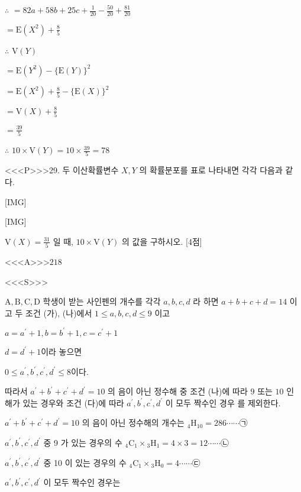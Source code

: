 \documentclass{oblivoir}
\begin{document}
$\therefore$ $=82 a+58 b+25 c+\frac{1}{20}-\frac{50}{20}+\frac{81}{20}$

$= \mathrm{E}\left(X^{2}\right)+\frac{8}{5}$

$\therefore$ $\mathrm{V}(Y)$

$=\mathrm{E}\left(Y^{2}\right)-\{\mathrm{E}(Y)\}^{2}$

$=\mathrm{E}\left(X^{2}\right)+\frac{8}{5}-\{\mathrm{E}(X)\}^{2}$

$=\mathrm{V}(X)+\frac{8}{5}$

$=\frac{39}{5}$

$\therefore$ $10 \times \mathrm{V}(Y)=10 \times \frac{39}{5}=78 $


<<<P>>>29. 두 이산확률변수 $X, Y$ 의 확률분포를 표로 나타내면 각각 다음과 같다.

[IMG]

[IMG]

$\mathrm{V}(X)=\frac{31}{5}$ 일 때, $10 \times \mathrm{V}(Y)$ 의 값을 구하시오. [4점]

<<<A>>>$218$

<<<S>>>



$\mathrm{A}, \mathrm{B}, \mathrm{C}, \mathrm{D}$ 학생이 받는 사인펜의 개수를 각각 $a, b, c, d$ 라 하면 $a+b+c+d=14$ 이고
두 조건 (가), (나)에서 $1 \leq a, b, c, d \leq 9$ 이고

$a=a^{\prime}+1, b=b^{\prime}+1, c=c^{\prime}+1$

$d=d^{\prime}+1$이라 놓으면

$0 \leq a^{\prime}, b^{\prime}, c^{\prime}, d^{\prime} \leq 8 $이다.

따라서 $a^{\prime}+b^{\prime}+c^{\prime}+d^{\prime}=10$ 의 음이 아닌 정수해 중 조건 (나)에 따라 $9$ 또는 $10$ 인 해가 있는 경우와 조건 (다)에 따라 $a^{\prime}, b^{\prime}, c^{\prime}, d^{\prime}$ 이 모두 짝수인 경우 를 제외한다.

$a^{\prime}+b^{\prime}+c^{\prime}+d^{\prime}=10$ 의 음이 아닌 정수해의 개수는
${ }_{4} \mathrm{H}_{10}=286 \cdots \cdots $㉠

$a^{\prime}, b^{\prime}, c^{\prime}, d^{\prime}$ 중 9 가 있는 경우의 수
${ }_{4} \mathrm{C}_{1} \times{ }_{3} \mathrm{H}_{1}=4 \times 3=12 \cdots \cdots $㉡

$a^{\prime}, b^{\prime}, c^{\prime}, d^{\prime}$ 중 10 이 있는 경우의 수
${ }_{4} \mathrm{C}_{1} \times{ }_{3} \mathrm{H}_{0}=4 \cdots \cdots $㉢

$a^{\prime}, b^{\prime}, c^{\prime}, d^{\prime}$ 이 모두 짝수인 경우는
\end{document}
